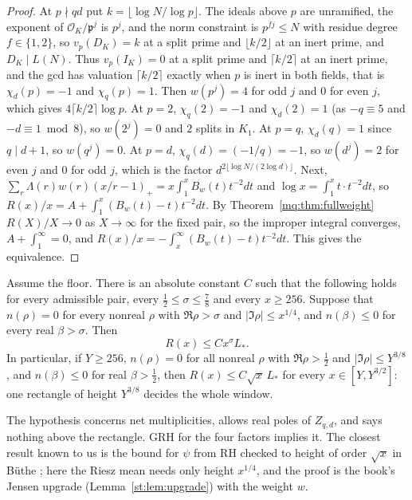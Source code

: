 \begin{proof}
At $p\nmid qd$ put $k=\lfloor\log N/\log p\rfloor$. The ideals above $p$ are unramified, the exponent of $\mathcal O_K/\mathfrak p^j$ is $p^j$, and the norm constraint is $p^{fj}\le N$ with residue degree $f\in\{1,2\}$, so $v_p(D_K)=k$ at a split prime and $\lfloor k/2\rfloor$ at an inert prime, and $D_K\mid L(N)$. Thus $v_p(I_K)=0$ at a split prime and $\lceil k/2\rceil$ at an inert prime, and the gcd has valuation $\lceil k/2\rceil$ exactly when $p$ is inert in both fields, that is $\chi_d(p)=-1$ and $\chi_q(p)=1$. Then $w(p^j)=4$ for odd $j$ and $0$ for even $j$, which gives $4\lceil k/2\rceil\log p$. At $p=2$, $\chi_q(2)=-1$ and $\chi_d(2)=1$ (as $-q\equiv5$ and $-d\equiv1\bmod8$), so $w(2^j)=0$ and $2$ splits in $K_1$. At $p=q$, $\chi_d(q)=1$ since $q\mid d+1$, so $w(q^j)=0$. At $p=d$, $\chi_q(d)=(-1/q)=-1$, so $w(d^j)=2$ for even $j$ and $0$ for odd $j$, which is the factor $d^{2\lfloor\log N/(2\log d)\rfloor}$. Next, $\sum_r\Lambda(r)w(r)(x/r-1)_+=x\int_1^xB_w(t)t^{-2}dt$ and $\log x=\int_1^xt\cdot t^{-2}dt$, so $R(x)/x=A+\int_1^x(B_w(t)-t)t^{-2}dt$. By Theorem~\ref{mq:thm:fullweight} $R(X)/X\to0$ as $X\to\infty$ for the fixed pair, so the improper integral converges, $A+\int_1^\infty=0$, and $R(x)/x=-\int_x^\infty(B_w(t)-t)t^{-2}dt$. This gives the equivalence.
\end{proof}

\begin{theorem}\label{mq:thm:finiteheight}
Assume the floor. There is an absolute constant $C$ such that the following holds for every admissible pair, every $\frac12\le\sigma\le\frac78$ and every $x\ge256$. Suppose that $n(\rho)=0$ for every nonreal $\rho$ with $\Re\rho>\sigma$ and $|\Im\rho|\le x^{1/4}$, and $n(\beta)\le0$ for every real $\beta>\sigma$. Then
\[
R(x)\le Cx^\sigma L_*.
\]
In particular, if $Y\ge256$, $n(\rho)=0$ for all nonreal $\rho$ with $\Re\rho>\frac12$ and $|\Im\rho|\le Y^{3/8}$, and $n(\beta)\le0$ for real $\beta>\frac12$, then $R(x)\le C\sqrt x\,L_*$ for every $x\in[Y,Y^{3/2}]$: one rectangle of height $Y^{3/8}$ decides the whole window.
\end{theorem}

The hypothesis concerns net multiplicities, allows real poles of $Z_{q,d}$, and says nothing above the rectangle. GRH for the four factors implies it. The closest result known to us is the bound for $\psi$ from RH checked to height of order $\sqrt x$ in B\"uthe \cite{Buthe16}; here the Riesz mean needs only height $x^{1/4}$, and the proof is the book's Jensen upgrade (Lemma~\ref{st:lem:upgrade}) with the weight $w$.

